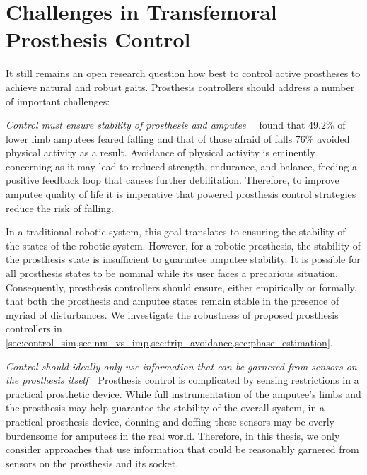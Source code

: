 \section{Challenges in Transfemoral Prosthesis
Control}\label{sec:intro_challenges} 

It still remains an open research question how best to control active prostheses
to achieve natural and robust gaits. Prosthesis controllers should address a
number of important challenges: 

\begin{challenges}
    \item\label{chal:robust} \emph{Control must ensure stability of prosthesis
    and amputee}~~\citet{miller2001prevalence} found that 49.2\% of lower
    limb amputees feared falling and that of those afraid of falls 76\% avoided
    physical activity as a result. Avoidance of physical activity is eminently
    concerning as it may lead to reduced strength, endurance, and balance,
    feeding a positive feedback loop that causes further debilitation.
    Therefore, to improve amputee quality of life it is imperative that powered
    prosthesis control strategies reduce the risk of falling. 
    
    In a traditional robotic system, this goal translates to ensuring the
    stability of the states of the robotic system. However, for a robotic
    prosthesis, the stability of the prosthesis state is insufficient to
    guarantee amputee stability. It is possible for all prosthesis states to be
    nominal while its user faces a precarious situation. Consequently,
    prosthesis controllers should ensure, either empirically or formally, that
    both the prosthesis and amputee states remain stable in the presence of
    myriad of disturbances. We investigate the robustness of proposed prosthesis
    controllers in
    \cref{sec:control_sim,sec:nm_vs_imp,sec:trip_avoidance,sec:phase_estimation}.
    
    \item\label{chal:sensing} \emph{Control should ideally only use information
    that can be garnered from sensors on the prosthesis itself}~~Prosthesis
    control is complicated by sensing restrictions in a practical prosthetic
    device. While full instrumentation of the amputee's limbs and the prosthesis
    may help guarantee the stability of the overall system, in a practical
    prosthesis device, donning and doffing these sensors may be overly
    burdensome for amputees in the real world. Therefore, in this thesis, we
    only consider approaches that use information that could be reasonably
    garnered from sensors on the prosthesis and its socket.


\end{challenges}
